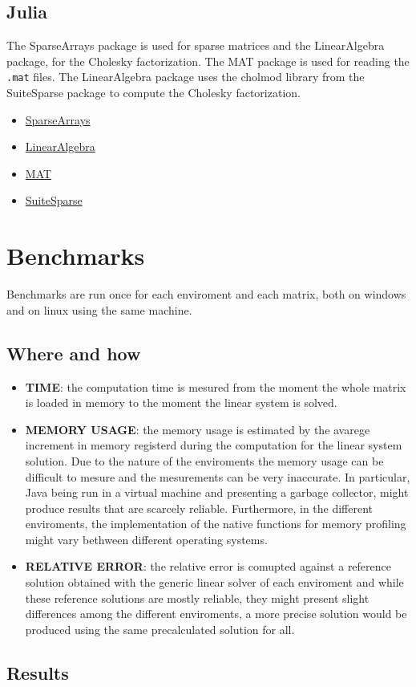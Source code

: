 \documentclass{report}
\begin{document}
        \section{Julia}
            The SparseArrays package is used for sparse matrices and the LinearAlgebra package, for the Cholesky factorization.
            The MAT package is used for reading the \texttt{.mat} files.
            The LinearAlgebra package uses the cholmod library from the SuiteSparse package to compute the Cholesky factorization.

            \begin{itemize}
                \item \href{https://docs.julialang.org/en/v1/stdlib/SparseArrays/}{SparseArrays}
                \item \href{https://docs.julialang.org/en/v1/stdlib/LinearAlgebra/}{LinearAlgebra}
                \item \href{https://github.com/JuliaIO/MAT.jl}{MAT}
                \item \href{http://suitesparse.com}{SuiteSparse}
            \end{itemize}

    \chapter{Benchmarks}
        Benchmarks are run once for each enviroment and each matrix, both on windows and on linux using the same machine.
        \section{Where and how}
            \begin{itemize}
                \item \textbf{TIME}: the computation time is mesured from the moment the whole matrix is loaded in memory to the moment the linear system is solved.
                \item \textbf{MEMORY USAGE}: the memory usage is estimated by the avarege increment in memory registerd during the computation for the linear system solution.
                Due to the nature of the enviroments the memory usage can be difficult to mesure and the mesurements can be very inaccurate.
                In particular, Java being run in a virtual machine and presenting a garbage collector, might produce results that are scarcely reliable. Furthermore, in the different enviroments, the implementation of the native functions for memory profiling might vary bethween different operating systems.
                \item \textbf{RELATIVE ERROR}: the relative error is comupted against a reference solution obtained with the generic linear solver of each enviroment and while these reference solutions are mostly reliable, they might present slight differences among the different enviroments, a more precise solution would be produced using the same precalculated solution for all.
            \end{itemize}
        \section{Results}
\end{document}
